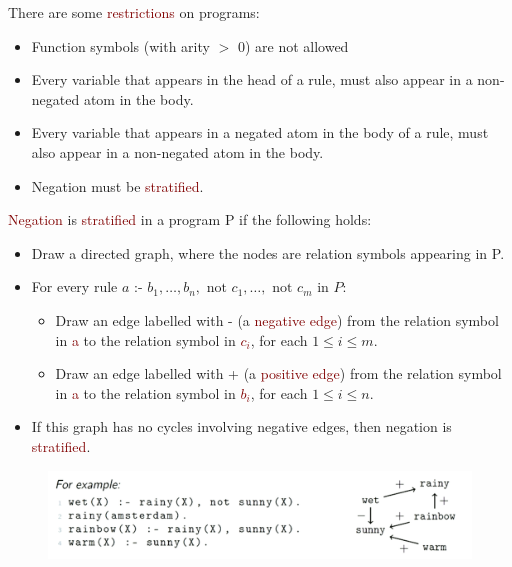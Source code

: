 There are some \textcolor{Maroon}{restrictions} on programs:
\begin{itemize}
    \setlength\itemsep{0em}
    \item Function symbols (with arity $>$ 0) are not allowed
    \item Every variable that appears in the head of a rule, must also appear in a non-negated atom in the body.
    \item Every variable that appears in a negated atom in the body of a rule, must also appear in a non-negated atom in the body.
    \item Negation must be \textcolor{Maroon}{stratified}.
\end{itemize}

\textcolor{Maroon}{Negation} is \textcolor{Maroon}{stratified} in a program P if the following holds:
\begin{itemize}
    \setlength\itemsep{0em}
    \item Draw a directed graph, where the nodes are relation symbols appearing in P.
    \item For every rule $a \text{ :- } b_1, \ldots, b_n, \text{ not } c_1, \ldots, \text{ not } c_m$ in $P$:
    \begin{itemize}
        \item Draw an edge labelled with - (a \textcolor{Maroon}{negative edge}) from the relation symbol in \textcolor{Maroon}{a} to the relation symbol in \textcolor{Maroon}{$c_i$}, for each $1 \leq i \leq m$.
        \item Draw an edge labelled with + (a \textcolor{Maroon}{positive edge})  from the relation symbol in \textcolor{Maroon}{a} to the relation symbol in \textcolor{Maroon}{$b_i$}, for each $1 \leq i \leq n$.
    \end{itemize}
    \item If this graph has no cycles involving negative edges, then negation is \textcolor{Maroon}{stratified}.
\end{itemize}

\begin{figure}[ht!]
	\centering
	\includegraphics[scale=0.6]{figures/strat.png}
\end{figure}

